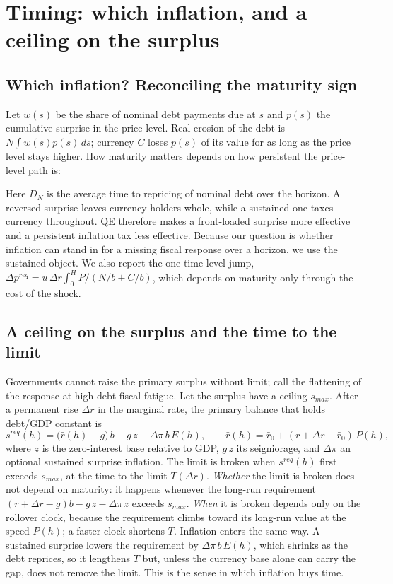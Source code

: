 \section{Timing: which inflation, and a ceiling on the surplus}\label{app:timing}
\setcounter{table}{0}\setcounter{figure}{0}

\subsection{Which inflation? Reconciling the maturity sign}\label{app:whichinflation}

Let $w(s)$ be the share of nominal debt payments due at $s$ and $p(s)$ the cumulative surprise in the price level. Real erosion of the debt is $N\int w(s)p(s)\,ds$; currency $C$ loses $p(s)$ of its value for as long as the price level stays higher. How maturity matters depends on how persistent the price-level path is:



Here $D_N$ is the average time to repricing of nominal debt over the horizon. A reversed surprise leaves currency holders whole, while a sustained one taxes currency throughout. QE therefore makes a front-loaded surprise more effective and a persistent inflation tax less effective. Because our question is whether inflation can stand in for a missing fiscal response over a horizon, we use the sustained object. We also report the one-time level jump, $\Delta p^{req}=u\,\Delta r\int_0^H P/(N/b+C/b)$, which depends on maturity only through the cost of the shock.

\subsection{A ceiling on the surplus and the time to the limit}\label{app:ceiling}

Governments cannot raise the primary surplus without limit; \citet{ghosh2013} call the flattening of the response at high debt fiscal fatigue. Let the surplus have a ceiling $s_{max}$. After a permanent rise $\Delta r$ in the marginal rate, the primary balance that holds debt/GDP constant is
\begin{equation}
s^{req}(h)=\big(\bar r(h)-g\big)\,b-g\,z-\Delta\pi\,b\,E(h),\qquad \bar r(h)=\bar r_0+(r+\Delta r-\bar r_0)\,P(h),
\end{equation}
where $z$ is the zero-interest base relative to GDP, $g\,z$ its seigniorage, and $\Delta\pi$ an optional sustained surprise inflation. The limit is broken when $s^{req}(h)$ first exceeds $s_{max}$, at the time to the limit $T(\Delta r)$. \emph{Whether} the limit is broken does not depend on maturity: it happens whenever the long-run requirement $(r+\Delta r-g)b-g\,z-\Delta\pi\,z$ exceeds $s_{max}$. \emph{When} it is broken depends only on the rollover clock, because the requirement climbs toward its long-run value at the speed $P(h)$; a faster clock shortens $T$. Inflation enters the same way. A sustained surprise lowers the requirement by $\Delta\pi\,b\,E(h)$, which shrinks as the debt reprices, so it lengthens $T$ but, unless the currency base alone can carry the gap, does not remove the limit. This is the sense in which inflation buys time.

